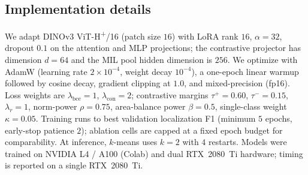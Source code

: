\subsection{Implementation details}
\label{sec:impl}
We adapt DINOv3 ViT-H\textsuperscript{+}/16 (patch size $16$) with LoRA rank
$16$, $\alpha{=}32$, dropout $0.1$ on the attention and MLP projections; the
contrastive projector has dimension $d{=}64$ and the MIL pool hidden dimension
is $256$. We optimize with AdamW (learning rate $2\!\times\!10^{-4}$, weight
decay $10^{-4}$), a one-epoch linear warmup followed by cosine decay, gradient
clipping at $1.0$, and mixed-precision (fp16). Loss weights are
$\lambda_{\text{bce}}{=}1$, $\lambda_{\text{con}}{=}2$; contrastive margins
$\tau^{+}{=}0.60$, $\tau^{-}{=}0.15$, $\lambda_r{=}1$, norm-power $\rho{=}0.75$,
area-balance power $\beta{=}0.5$, single-class weight $\kappa{=}0.05$. Training
runs to best validation localization F1 (minimum $5$ epochs, early-stop patience
$2$); ablation cells are capped at a fixed epoch budget for comparability. At
inference, $k$-means uses $k{=}2$ with $4$ restarts. Models were trained on
NVIDIA L4 / A100 (Colab) and dual RTX~2080~Ti hardware; timing is reported on a
single RTX~2080~Ti.

